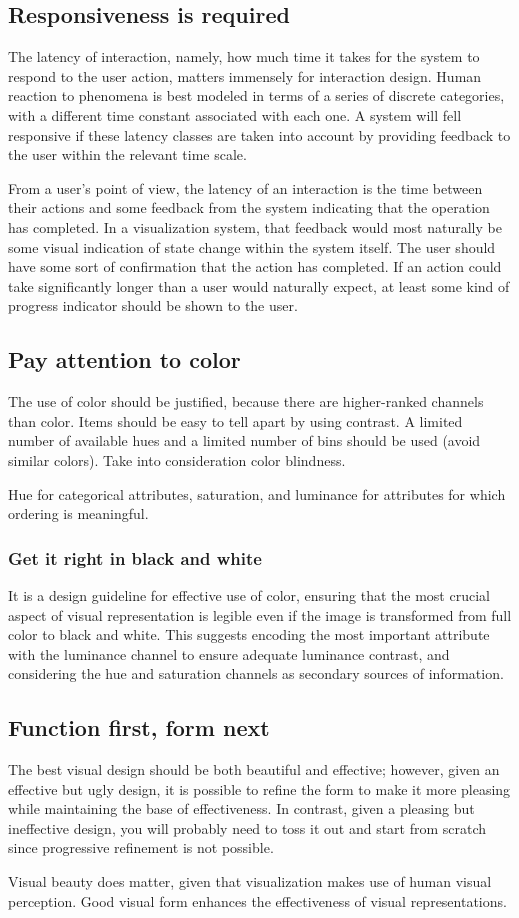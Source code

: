 \subsection{Responsiveness is required}
The latency of interaction, namely, how much time it takes for the system to respond to the user action, matters immensely for interaction design. Human reaction to phenomena is best modeled in terms of a series of discrete categories, with a different time constant associated with each one. A system will fell responsive if these latency classes are taken into account by providing feedback to the user within the relevant time scale. \par
From a user's point of view, the latency of an interaction is the time between their actions and some feedback from the system indicating that the operation has completed. In a visualization system, that feedback would most naturally be some visual indication of state change within the system itself. The user should have some sort of confirmation that the action has completed. If an action could take significantly longer than a user would naturally expect, at least some kind of progress indicator should be shown to the user. 

\subsection{Pay attention to color}
The use of color should be justified, because there are higher-ranked channels than color. Items should be easy to tell apart by using contrast. A limited number of available hues and a limited number of bins should be used (avoid similar colors). Take into consideration color blindness. \par
Hue for categorical attributes, saturation, and luminance for attributes for which ordering is meaningful.
\subsubsection{Get it right in black and white}
It is a design guideline for effective use of color, ensuring that the most crucial aspect of visual representation is legible even if the image is transformed from full color to black and white. This suggests encoding the most important attribute with the luminance channel to ensure adequate luminance contrast, and considering the hue and saturation channels as secondary sources of information. 

\subsection{Function first, form next}
The best visual design should be both beautiful and effective; however, given an effective but ugly design, it is possible to refine the form to make it more pleasing while maintaining the base of effectiveness. In contrast, given a pleasing but ineffective design, you will probably need to toss it out and start from scratch since progressive refinement is not possible. \par
Visual beauty does matter, given that visualization makes use of human visual perception. Good visual form enhances the effectiveness of visual representations. 

